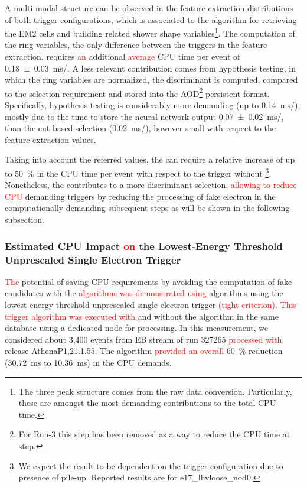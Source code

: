 A multi-modal structure can be observed in the feature extraction distributions
of both trigger configurations, which is associated to the algorithm
for retrieving the EM2 cells and building related shower shape
variables\footnote{The three peak structure comes from the raw data conversion.
	Particularly, these are amongst the most-demanding contributions to
	the \fastcalo total CPU time.}. The computation of the ring variables, the only difference between the
triggers in the \fastcalo feature extraction, requires \textcolor{red}{an} additional \textcolor{red}{average} CPU time per
event of \SI{0.18 \pm 0.03}{\ms/}. 
A less relevant contribution
comes from hypothesis testing, in which the ring variables are normalized, the
discriminant is computed, compared to the selection requirement and stored into
the AOD\footnote{For Run-3 this step has been removed as a way to reduce the CPU time at \fastcalo step.} 
persistent format. 
Specifically, \rnn{} hypothesis testing is considerably more demanding
(up to \SI{0.14}{\ms/}), mostly due to the time 
to store the neural network output \SI{0.07 \pm 0.02}{\ms/}, 
than the cut-based selection
(\SI{0.02}{\ms/}), however small with respect to the feature
extraction values. 


Taking into account the referred values, the \rnn{} can require a
relative increase of up to \SI{50}{\%} in the \fastcalo{} CPU time per event
with respect to the trigger without \rnn\footnote{We expect the result to be
	dependent on the trigger configuration due to presence of pile-up. Reported
	results are for e17\_lhvloose\_nod0.}. Nonetheless, the \rnn contributes to
a more discriminant selection, \textcolor{red}{allowing to reduce CPU} demanding triggers
by reducing the processing of fake electron in the computationally demanding
subsequent steps as will be shown in the following subsection.

\FloatBarrier
\subsubsection{Estimated CPU Impact \textcolor{red}{on} the Lowest-Energy Threshold Unprescaled
	Single Electron Trigger}\label{top:cpu_e26}

\textcolor{red}{The} potential of saving CPU requirements by
avoiding the computation of fake candidates with the \rnn \textcolor{red}{algorithms was demonstrated using} algorithms using the
lowest-energy-threshold unprescaled single electron trigger
\textcolor{red}{(tight criterion). This trigger algorithm was executed with}
and without the \rnn algorithm in the same database using a dedicated node for processing.
In this measurement, we considered about 3,400 events from EB stream of run
327265 \textcolor{red}{processed with} release AthenaP1,21.1.55. The \rnn algorithm \textcolor{red}{provided an overall} 
\SI{60}{\%} reduction (\SI{30.72}{\milli\second} to \SI{10.36}{\milli\second})
in the CPU demands.


